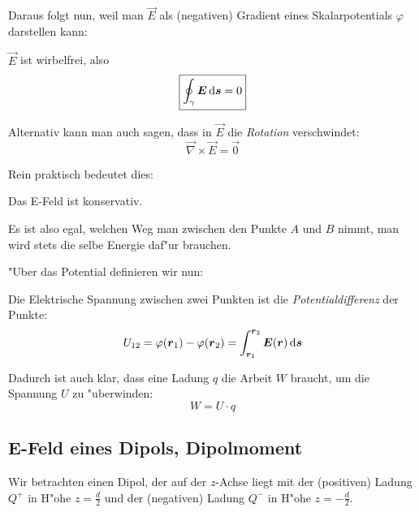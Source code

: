 Daraus folgt nun, weil man $\vec E$ als (negativen) Gradient eines
Skalarpotentials $\varphi$ darstellen kann:
\begin{Wichtig}
   $\vec E$ ist wirbelfrei, also
   \begin{equation}
      \label{eqn_e-wirbelfrei}
\boxed{\oint_\gamma \boldsymbol{E} \, \mathrm{d} \boldsymbol{s} = 0   }
   \end{equation}
\end{Wichtig}
Alternativ kann man auch sagen, dass in $\vec E$ die
\emph{Rotation} verschwindet:
\begin{equation}
   \label{eq:183}
   \vec \nabla \times \vec E = \vec 0
\end{equation}

Rein praktisch bedeutet dies:
\begin{Wichtig}
   Das E-Feld ist konservativ.
\end{Wichtig}
Es ist also egal, welchen Weg man zwischen den Punkte $A$ und $B$
nimmt, man wird stets die selbe Energie daf"ur brauchen.

\bigskip

"Uber das Potential definieren wir nun:
\begin{Def}
   [Spannung $U$]
Die Elektrische Spannung zwischen zwei Punkten ist die
\emph{Potentialdifferenz}  der Punkte:
\begin{equation}
   \label{eq:184}
   U_{12} = \varphi(\boldsymbol{r}_1) - \varphi(\boldsymbol{r}_2) = \int_{\boldsymbol{r}_1}^{\boldsymbol{r}_2} \boldsymbol{E} (\boldsymbol{r}) \, \mathrm{d} \boldsymbol{s}
\end{equation}
\end{Def}
Dadurch ist auch klar, dass eine Ladung $q$ die Arbeit $W$ braucht, um
die Spannung $U$ zu "uberwinden:
\begin{equation}
   \label{eq:185}
   W = U \cdot q
\end{equation}




\subsection{E-Feld eines Dipols, Dipolmoment}
\label{kap_e-feld-dipols}

Wir betrachten einen Dipol, der auf der $z$-Achse liegt mit der
(positiven) Ladung $Q^+$ in H"ohe $z = \frac{d}{2}$ und der
(negativen) Ladung $Q^-$ in H"ohe $z = -\frac{d}{2}$.

